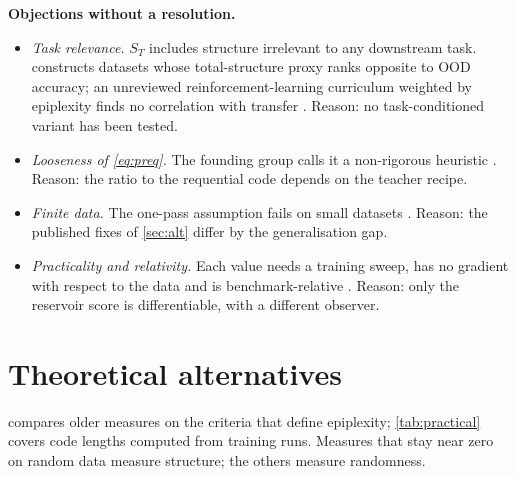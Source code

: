 \documentclass[11pt]{article}
\theoremstyle{tight}
\begin{document}
\begin{unsettled}
\textbf{Objections without a resolution.}
\begin{itemize}
\item \emph{Task relevance.} $S_T$ includes structure irrelevant to any downstream task.
\citet{li2026counterexample} constructs datasets whose total-structure proxy ranks opposite to OOD
accuracy; an unreviewed reinforcement-learning curriculum weighted by epiplexity finds no correlation
with transfer
\citep{sunnydigital}. Reason: no task-conditioned variant has been tested.
\item \emph{Looseness of \eqref{eq:preq}.} The founding group calls it a non-rigorous heuristic
\citep{qiu2026requential}. Reason: the ratio to the requential code depends on the teacher recipe.
\item \emph{Finite data.} The one-pass assumption fails on small datasets \citep{liu2026selfplay}.
Reason: the published fixes of \cref{sec:alt} differ by the generalisation gap.
\item \emph{Practicality and relativity.} Each value needs a training sweep, has no gradient with
respect to the data and is benchmark-relative
\citep{zhang2026learnablenovelty,cornelisse2026autonomy,takahashi2026thermo}. Reason: only the
reservoir score is differentiable, with a different observer.
\end{itemize}
\end{unsettled}

\section{Theoretical alternatives}\label{sec:theory}
 compares older measures on the criteria that define epiplexity; \cref{tab:practical}
covers code lengths computed from training runs. Measures that stay near zero on random data measure
structure; the others measure randomness.
\end{document}
